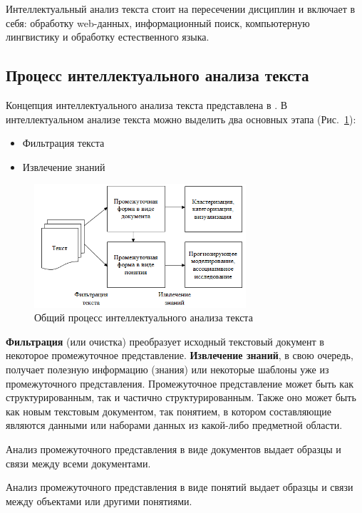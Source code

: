 \documentclass[14pt]{matmex-diploma-custom}
\begin{document}
Интеллектуальный анализ текста стоит на пересечении дисциплин и включает в себя: обработку web-данных, информационный поиск, компьютерную лингвистику и обработку естественного языка.

\subsection{Процесс интеллектуального анализа текста}

Концепция интеллектуального анализа текста представлена в \cite{article:text_mining}. В интеллектуальном анализе текста можно выделить два основных этапа (Рис.~\ref{img:text_mining}):

\begin{itemize}
\item Фильтрация текста
\item Извлечение знаний
\end{itemize}

\begin{figure}[h]
\centering
\includegraphics[width=0.7\textwidth]{img/text_mining}
\caption{Общий процесс интеллектуального анализа текста}
\label{img:text_mining}
\end{figure}

\textbf{Фильтрация} (или очистка) преобразует исходный текстовый документ в некоторое промежуточное представление. \textbf{Извлечение знаний}, в свою очередь, получает полезную информацию (знания) или некоторые шаблоны уже из промежуточного представления. Промежуточное представление может быть как структурированным, так и частично структурированным. Также оно может быть как новым текстовым документом, так понятием, в котором составляющие являются данными или наборами данных из какой-либо предметной области.

Анализ промежуточного представления в виде документов выдает образцы и связи между всеми документами. 

Анализ промежуточного представления в виде понятий выдает образцы и связи между объектами или другими понятиями.
\end{document}
